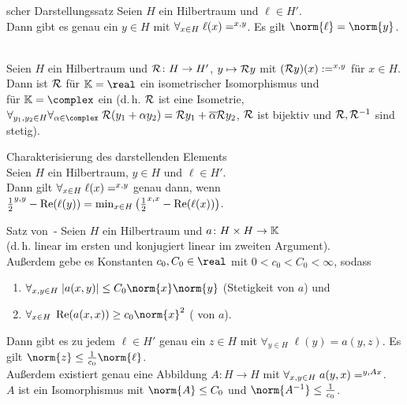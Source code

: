 \begin{Satz}{scher Darstellungssatz}
    Seien $H$ ein Hilbertraum und $\ell \in H'$.\\
    Dann gibt es genau ein $y \in H$ mit $\forall_{x \in H}\; \ell(x) = \sp{x, y}$.
    Es gilt $\norm{\ell} = \norm{y}$.
\end{Satz}

\begin{Kor}\\
    Seien $H$ ein Hilbertraum und $\R\colon H \rightarrow H'$, $y \mapsto \R y$ mit
    $(\R y)(x) := \sp{x, y}$ für $x \in H$.\\
    Dann ist $\R$ für $\KK = \real$ ein isometrischer Isomorphismus und\\
    für $\KK = \complex$ ein 
    (d.\,h. $\R$ ist eine Isometrie,\\
    $\forall_{y_1, y_2 \in H} \forall_{\alpha \in \complex}\;
    \R(y_1 + \alpha y_2) = \R y_1 + \overline{\alpha} \R y_2$,
    $\R$ ist bijektiv und $\R, \R^{-1}$ sind stetig).
\end{Kor}

\linie

\begin{Satz}{Charakterisierung des darstellenden Elements}\\
    Seien $H$ ein Hilbertraum, $y \in H$ und $\ell \in H'$.\\
    Dann gilt $\forall_{x \in H}\; \ell(x) = \sp{x, y}$
    genau dann, wenn\\
    $\frac{1}{2} \sp{y, y} - \Re(\ell(y)) =
    \min_{x \in H} \left(\frac{1}{2} \sp{x, x} - \Re(\ell(x))\right)$.
\end{Satz}

\linie

\begin{Satz}{Satz von \upshape\,\!-}
    Seien $H$ ein Hilbertraum und $a\colon H \times H \rightarrow \KK$ \\
    (d.\,h. linear im ersten und konjugiert linear im zweiten Argument).\\
    Außerdem gebe es Konstanten $c_0, C_0 \in \real$ mit $0 < c_0 < C_0 < \infty$, sodass
    \begin{enumerate}
        \item
        $\forall_{x, y \in H}\; |a(x, y)| \le C_0 \norm{x} \norm{y}$
        (Stetigkeit von $a$) und
        
        \item
        $\forall_{x \in H}\; \Re(a(x, x)) \ge c_0 \norm{x}^2$
        ( von $a$).
    \end{enumerate}
    Dann gibt es zu jedem $\ell \in H'$ genau ein $z \in H$ mit
    $\forall_{y \in H}\; \ell(y) = a(y, z)$.
    Es gilt $\norm{z} \le \frac{1}{c_0} \norm{\ell}$.\\
    Außerdem existiert genau eine Abbildung $A\colon H \rightarrow H$ mit
    $\forall_{x, y \in H}\; a(y, x) = \sp{y, Ax}$.\\
    $A$ ist ein Isomorphismus mit $\norm{A} \le C_0$ und
    $\norm{A^{-1}} \le \frac{1}{c_0}$.
\end{Satz}

\pagebreak
